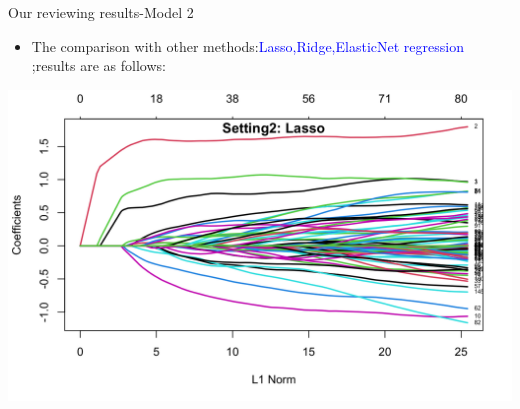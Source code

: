 \documentclass{beamer}
\begin{document}
\begin{frame}{Our reviewing results-Model 2}
    \begin{itemize}
        \item The comparison with other methods:\textcolor{blue}{Lasso,Ridge,ElasticNet regression} ;results are as follows:
    \end{itemize}
    \includegraphics[scale=0.2]{2.1.png}
\end{frame}
\end{document}
